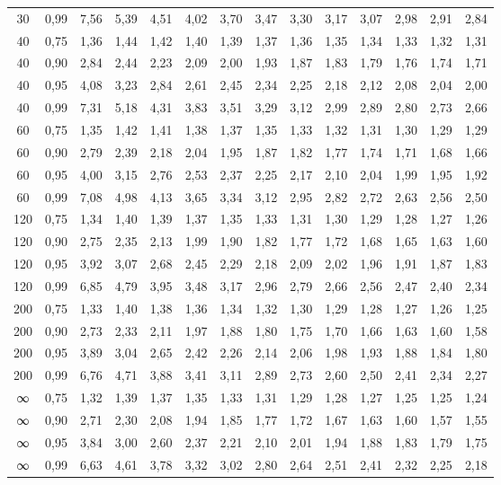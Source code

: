 \documentclass[
]{article}
\begin{document}
\begin{landscape}
\begin{longtable}[t]{cccccccccccccc}
30 & 0,99 & 7,56 & 5,39 & 4,51 & 4,02 & 3,70 & 3,47 & 3,30 & 3,17 & 3,07 & 2,98 & 2,91 & 2,84\\
40 & 0,75 & 1,36 & 1,44 & 1,42 & 1,40 & 1,39 & 1,37 & 1,36 & 1,35 & 1,34 & 1,33 & 1,32 & 1,31\\
40 & 0,90 & 2,84 & 2,44 & 2,23 & 2,09 & 2,00 & 1,93 & 1,87 & 1,83 & 1,79 & 1,76 & 1,74 & 1,71\\
40 & 0,95 & 4,08 & 3,23 & 2,84 & 2,61 & 2,45 & 2,34 & 2,25 & 2,18 & 2,12 & 2,08 & 2,04 & 2,00\\
40 & 0,99 & 7,31 & 5,18 & 4,31 & 3,83 & 3,51 & 3,29 & 3,12 & 2,99 & 2,89 & 2,80 & 2,73 & 2,66\\
60 & 0,75 & 1,35 & 1,42 & 1,41 & 1,38 & 1,37 & 1,35 & 1,33 & 1,32 & 1,31 & 1,30 & 1,29 & 1,29\\
60 & 0,90 & 2,79 & 2,39 & 2,18 & 2,04 & 1,95 & 1,87 & 1,82 & 1,77 & 1,74 & 1,71 & 1,68 & 1,66\\
60 & 0,95 & 4,00 & 3,15 & 2,76 & 2,53 & 2,37 & 2,25 & 2,17 & 2,10 & 2,04 & 1,99 & 1,95 & 1,92\\
60 & 0,99 & 7,08 & 4,98 & 4,13 & 3,65 & 3,34 & 3,12 & 2,95 & 2,82 & 2,72 & 2,63 & 2,56 & 2,50\\
120 & 0,75 & 1,34 & 1,40 & 1,39 & 1,37 & 1,35 & 1,33 & 1,31 & 1,30 & 1,29 & 1,28 & 1,27 & 1,26\\
120 & 0,90 & 2,75 & 2,35 & 2,13 & 1,99 & 1,90 & 1,82 & 1,77 & 1,72 & 1,68 & 1,65 & 1,63 & 1,60\\
120 & 0,95 & 3,92 & 3,07 & 2,68 & 2,45 & 2,29 & 2,18 & 2,09 & 2,02 & 1,96 & 1,91 & 1,87 & 1,83\\
120 & 0,99 & 6,85 & 4,79 & 3,95 & 3,48 & 3,17 & 2,96 & 2,79 & 2,66 & 2,56 & 2,47 & 2,40 & 2,34\\
200 & 0,75 & 1,33 & 1,40 & 1,38 & 1,36 & 1,34 & 1,32 & 1,30 & 1,29 & 1,28 & 1,27 & 1,26 & 1,25\\
200 & 0,90 & 2,73 & 2,33 & 2,11 & 1,97 & 1,88 & 1,80 & 1,75 & 1,70 & 1,66 & 1,63 & 1,60 & 1,58\\
200 & 0,95 & 3,89 & 3,04 & 2,65 & 2,42 & 2,26 & 2,14 & 2,06 & 1,98 & 1,93 & 1,88 & 1,84 & 1,80\\
200 & 0,99 & 6,76 & 4,71 & 3,88 & 3,41 & 3,11 & 2,89 & 2,73 & 2,60 & 2,50 & 2,41 & 2,34 & 2,27\\
∞ & 0,75 & 1,32 & 1,39 & 1,37 & 1,35 & 1,33 & 1,31 & 1,29 & 1,28 & 1,27 & 1,25 & 1,25 & 1,24\\
∞ & 0,90 & 2,71 & 2,30 & 2,08 & 1,94 & 1,85 & 1,77 & 1,72 & 1,67 & 1,63 & 1,60 & 1,57 & 1,55\\
∞ & 0,95 & 3,84 & 3,00 & 2,60 & 2,37 & 2,21 & 2,10 & 2,01 & 1,94 & 1,88 & 1,83 & 1,79 & 1,75\\
∞ & 0,99 & 6,63 & 4,61 & 3,78 & 3,32 & 3,02 & 2,80 & 2,64 & 2,51 & 2,41 & 2,32 & 2,25 & 2,18\\*
\end{longtable}
\endgroup{}
\end{landscape}
\end{document}
